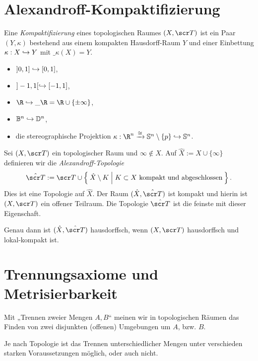 \section{Alexandroff-Kompaktifizierung}


\begin{df}
	Eine \emph{Kompaktifizierung} eines topologischen Raumes $(X, \scr T)$ ist ein Paar $(Y, \kappa)$ bestehend aus einem kompakten Hausdorff-Raum $Y$ und einer Einbettung $\kappa: X \hookrightarrow Y$ mit $\_{\kappa(X)} = Y$.
\end{df}

\begin{ex}
	\begin{itemize}
		\item
			$]0,1] \hookrightarrow [0,1]$,
		\item
			$]-1,1[ \hookrightarrow [-1,1]$,
		\item
			$\R \injto \_\R = \R \cup \{\pm\infty\}$,
		\item
			$\mathbb{B}^n \hookrightarrow \mathbb{D}^n$,
		\item
			die stereographische Projektion $\kappa: \R^n \homto \S^n \setminus \{p\} \injto \S^n$.
	\end{itemize}
\end{ex}

\begin{st}[Alexandroff]
	Sei $(X, \scr T)$ ein topologischer Raum und $\infty \not\in X$.
	Auf $\hat X := X \cup \{\infty\}$ definieren wir die \emph{Alexandroff-Topologie}
	\[
		\hat{\scr T} :=
		\scr T \cup \Set{ \hat X \setminus K | K \subset X \text{ kompakt und abgeschlossen} }.
	\]
	Dies ist eine Topologie auf $\hat X$.
	Der Raum $(\hat X, \hat{\scr T})$ ist kompakt und hierin ist $(X, \scr T)$ ein offener Teilraum.
	Die Topologie $\hat{\scr T}$ ist die feinste mit dieser Eigenschaft.

	Genau dann ist $(\hat X, \hat{\scr T})$ hausdorffsch, wenn $(X, \scr T)$ hausdorffsch und lokal-kompakt ist.
\end{st}


\section{Trennungsaxiome und Metrisierbarkeit}


Mit „Trennen zweier Mengen $A, B$“ meinen wir in topologischen Räumen das Finden von zwei disjunkten (offenen) Umgebungen um $A$, bzw. $B$.

Je nach Topologie ist das Trennen unterschiedlicher Mengen unter verschieden starken Voraussetzungen möglich, oder auch nicht.

